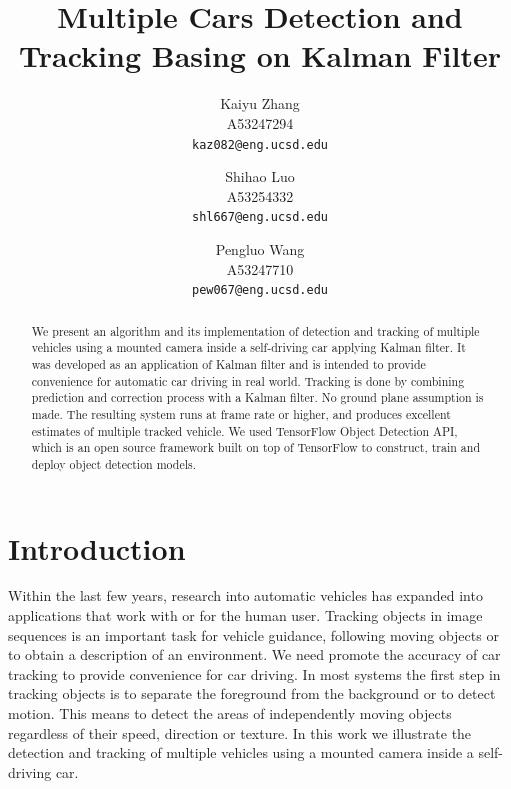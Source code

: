 \documentclass[10pt,twocolumn,letterpaper]{article}
\begin{document}
\title{Multiple Cars Detection and Tracking Basing on Kalman Filter}

\author{Kaiyu Zhang\\
A53247294\\
{\tt\small kaz082@eng.ucsd.edu}
\and
Shihao Luo\\
A53254332\\
{\tt\small shl667@eng.ucsd.edu}
\and
Pengluo Wang\\
A53247710\\
{\tt\small pew067@eng.ucsd.edu}
}
\maketitle

\begin{abstract}
We present an algorithm and its implementation of detection and tracking of multiple vehicles using a mounted camera inside a self-driving car applying Kalman filter. It was developed as an application of Kalman filter and is intended to provide convenience for automatic car driving in real world. Tracking is done by combining prediction and correction process with a
Kalman filter. No ground plane
assumption is made. The resulting system runs at frame rate or higher, and produces excellent estimates of multiple tracked vehicle. We used TensorFlow Object Detection API, which is an open source framework built on top of TensorFlow to construct, train and deploy object detection models.
\end{abstract}

\section{Introduction}

Within the last few years, research into automatic vehicles has expanded into applications that work with or for the human user. Tracking objects in image sequences is an important task for
vehicle guidance, following moving objects or to obtain a description
of an environment. We need promote the accuracy of car tracking to provide convenience for car driving. In most systems the first step in
tracking objects is to separate the foreground from the background
or to detect motion. This means to detect the areas of independently moving objects regardless
of their speed, direction or texture. In this work we illustrate the detection and tracking of multiple vehicles using a mounted camera inside a self-driving car. 
\end{document}
